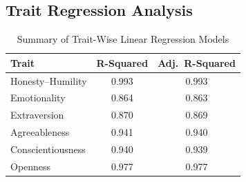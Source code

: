 




\subsection{Trait Regression Analysis}
\label{app:regression}
\begin{table}[!htb]
\centering
\caption{Summary of Trait-Wise Linear Regression Models}
\label{tab:regression_analysis}
\renewcommand\arraystretch{1.2}

\begin{tabularx}{\columnwidth}{@{}Xcc@{}}
\toprule
\textbf{Trait} & \textbf{R-Squared} & \textbf{Adj.~R-Squared} \\
\midrule
\textcolor{hexH}{Honesty--Humility}   & 0.993 & 0.993 \\
\textcolor{hexE}{Emotionality}        & 0.864 & 0.863 \\
\textcolor{hexX}{Extraversion}        & 0.870 & 0.869 \\
\textcolor{hexA}{Agreeableness}       & 0.941 & 0.940 \\
\textcolor{hexC}{Conscientiousness}   & 0.940 & 0.939 \\
\textcolor{hexO}{Openness}            & 0.977 & 0.977 \\
\bottomrule
\end{tabularx}
\end{table}

